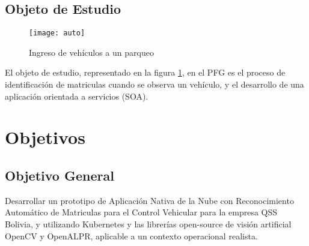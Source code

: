     \subsection{Objeto de Estudio}
        \begin{figure}[H]
            \centering
            \texttt{[image: auto]}
            \caption{Ingreso de vehículos a un parqueo}
            \label{fig:auto}
        \end{figure}
        El objeto de estudio, representado en la figura \ref{fig:auto}, en el PFG es el proceso de identificación de matriculas cuando se observa un vehículo, y el desarrollo de una aplicación orientada a servicios (SOA).

\section{Objetivos}

    \subsection{Objetivo General}
    Desarrollar un prototipo de Aplicación Nativa de la Nube con Reconocimiento Automático de Matriculas para el Control Vehicular para la empresa QSS Bolivia, y utilizando Kubernetes y las librerías open-source de visión artificial OpenCV  y OpenALPR, aplicable a un contexto operacional realista.
